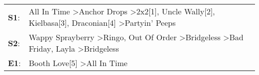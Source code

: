 \begin{supertabular}{p{0.03\textwidth}p{0.92\textwidth}}
 \textbf{S1}:  &  All In Time\textsuperscript{} \textgreater \enspace Anchor Drops\textsuperscript{} \textgreater \enspace 2x2[1]\textsuperscript{}, \enspace Uncle Wally[2]\textsuperscript{}, \enspace Kielbasa[3]\textsuperscript{}, \enspace Draconian[4]\textsuperscript{} \textgreater \enspace Partyin' Peeps\textsuperscript{}  \enspace  \\
 \textbf{S2}:  &  Wappy Sprayberry\textsuperscript{} \textgreater \enspace Ringo\textsuperscript{}, \enspace Out Of Order\textsuperscript{} \textgreater \enspace Bridgeless\textsuperscript{} \textgreater \enspace Bad Friday\textsuperscript{}, \enspace Layla\textsuperscript{} \textgreater \enspace Bridgeless\textsuperscript{}  \enspace  \\
 \textbf{E1}:  &                                                                                                                                                                                                                                   Booth Love[5]\textsuperscript{} \textgreater \enspace All In Time\textsuperscript{}  \enspace  \\
\end{supertabular}
